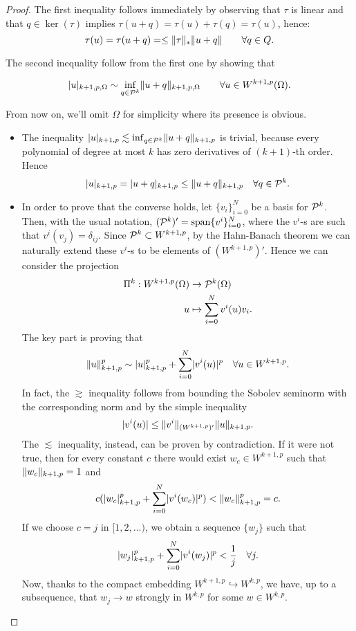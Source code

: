 \begin{proof}
The first inequality follows immediately by observing that $\tau$ is linear and that $q\in \ker(\tau)$ implies $\tau(u+q) = \tau(u) + \tau(q) = \tau(u)$, hence:
\[
\tau(u) = \tau(u+q) = \le \norm{\tau}_* \norm{u+q} \qquad \forall q \in Q.
\]

The second inequality follow from the first one by showing that~\cite{ciarlet78}
\begin{lemma}
  \begin{equation}
    \abs{u}_{k+1,p,\Omega} \sim \inf_{q \in \P^k} \norm{u+q}_{k+1,p,\Omega} \qquad \forall u \in W^{k+1,p}(\Omega).
    \label{eqn:deny-lions}
  \end{equation}
\end{lemma}

From now on, we'll omit $\Omega$ for simplicity where its presence is obvious.
\begin{itemize}
\item The inequality $\abs{u}_{k+1,p} \lesssim \inf_{q \in \P^k} \norm{u+q}_{k+1,p}$ is trivial, because every polynomial of degree at most $k$ has zero derivatives of $(k+1)$-th order. Hence
\[
\abs{u}_{k+1,p} = \abs{u+q}_{k+1,p} \le \norm{u+q}_{k+1,p} \quad \forall q \in \P^k.
\]
\item In order to prove that the converse holds, let $\{v_i\}_{i=0}^N$ be a basis for $\P^k$. Then, with the usual notation, $(\P^k)'=\Span\{v^i\}_{i=0}^N$, where the $v^i$-s are such that $v^i(v_j)=\delta_{ij}$. Since $\P^k \subset W^{k+1,p}$, by the Hahn-Banach theorem we can naturally extend these $v^i$-s to be elements of $(W^{k+1,p})'$. Hence we can consider the projection
\begin{align}
\Pi^k:  W^{k+1,p}(\Omega) & \to \P^k(\Omega)\\
u & \mapsto \sum_{i=0}^N v^i(u) v_i.
\end{align}
The key part is proving that
\begin{equation}\label{eqn:deny-lions-exp}
\norm{u}_{k+1,p}^p \sim \abs{u}_{k+1,p}^p + \sum_{i=0}^N \abs{v^i(u)}^p \quad \forall u \in W^{k+1,p}.
\end{equation}
In fact, the $\gtrsim$ inequality follows from bounding the Sobolev seminorm with the corresponding norm and by the simple inequality
\[
\abs{v^i(u)} \le \norm{v^i}_{(W^{k+1,p})'} \norm{u}_{k+1,p}.
\]
The $\lesssim$ inequality, instead, can be proven by contradiction. If it were not true, then for every constant $c$ there would exist $w_c \in W^{k+1,p}$ such that $\norm{w_c}_{k+1,p} = 1$ and
\[
c(\abs{w_c}_{k+1,p}^p + \sum_{i=0}^N \abs{v^i(w_c)}^p) < \norm{w_c}_{k+1,p}^p = c.
\]
If we choose $c=j$ in $[1,2,\dots)$, we obtain a sequence $\{w_j\}$ such that
\begin{equation} \label{eqn:deny-lions-proof}
\abs{w_j}_{k+1,p}^p + \sum_{i=0}^N \abs{v^i(w_j)}^p < \frac{1}{j} \quad \forall j.
\end{equation}
Now, thanks to the compact embedding $W^{k+1,p} \hookrightarrow W^{k,p}$, we have, up to a subsequence, that $w_j \to w$ strongly in $W^{k,p}$ for some $w \in W^{k,p}$.


\end{itemize}
\end{proof}
